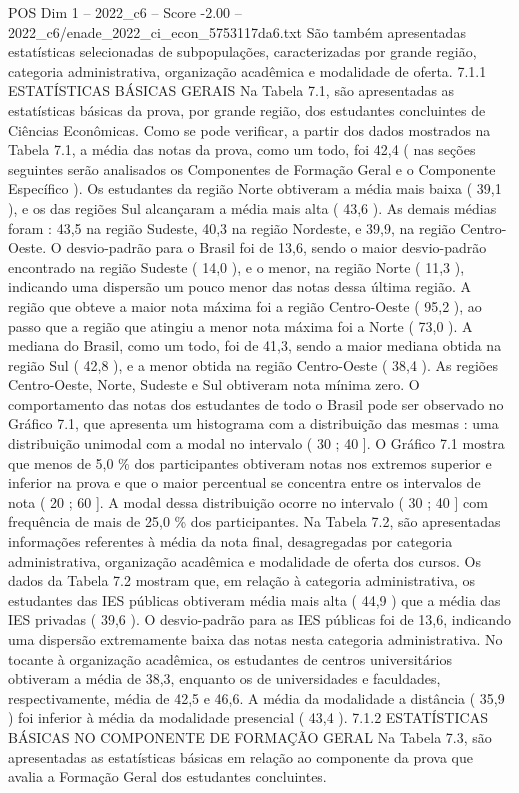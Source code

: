 \begin{textsample}{POS Dim 1 – 2022\_c6 – Score -2.00 – 2022\_c6/enade\_2022\_ci\_econ\_5753117da6.txt}
São também apresentadas estatísticas selecionadas de subpopulações, caracterizadas por grande região, categoria administrativa, organização acadêmica e modalidade de oferta. 7.1.1 ESTATÍSTICAS BÁSICAS GERAIS Na Tabela 7.1, são apresentadas as estatísticas básicas da prova, por grande região, dos estudantes concluintes de Ciências Econômicas.
Como se pode verificar, a partir dos dados mostrados na Tabela 7.1, a média das notas da prova, como um todo, foi 42,4 ( nas seções seguintes serão analisados os Componentes de Formação Geral e o Componente Específico ).
Os estudantes da região Norte obtiveram a média mais baixa ( 39,1 ), e os das regiões Sul alcançaram a média mais alta ( 43,6 ).
As demais médias foram : 43,5 na região Sudeste, 40,3 na região Nordeste, e 39,9, na região Centro-Oeste.
O desvio-padrão para o Brasil foi de 13,6, sendo o maior desvio-padrão encontrado na região Sudeste ( 14,0 ), e o menor, na região Norte ( 11,3 ), indicando uma dispersão um pouco menor das notas dessa última região.
A região que obteve a maior nota máxima foi a região Centro-Oeste ( 95,2 ), ao passo que a região que atingiu a menor nota máxima foi a Norte ( 73,0 ).
A mediana do Brasil, como um todo, foi de 41,3, sendo a maior mediana obtida na região Sul ( 42,8 ), e a menor obtida na região Centro-Oeste ( 38,4 ).
As regiões Centro-Oeste, Norte, Sudeste e Sul obtiveram nota mínima zero.
O comportamento das notas dos estudantes de todo o Brasil pode ser observado no Gráfico 7.1, que apresenta um histograma com a distribuição das mesmas : uma distribuição unimodal com a modal no intervalo ( 30 ; 40 ].
O Gráfico 7.1 mostra que menos de 5,0 \% dos participantes obtiveram notas nos extremos superior e inferior na prova e que o maior percentual se concentra entre os intervalos de nota ( 20 ; 60 ].
A modal dessa distribuição ocorre no intervalo ( 30 ; 40 ] com frequência de mais de 25,0 \% dos participantes.
Na Tabela 7.2, são apresentadas informações referentes à média da nota final, desagregadas por categoria administrativa, organização acadêmica e modalidade de oferta dos cursos.
Os dados da Tabela 7.2 mostram que, em relação à categoria administrativa, os estudantes das IES públicas obtiveram média mais alta ( 44,9 ) que a média das IES privadas ( 39,6 ).
O desvio-padrão para as IES públicas foi de 13,6, indicando uma dispersão extremamente baixa das notas nesta categoria administrativa.
No tocante à organização acadêmica, os estudantes de centros universitários obtiveram a média de 38,3, enquanto os de universidades e faculdades, respectivamente, média de 42,5 e 46,6.
A média da modalidade a distância ( 35,9 ) foi inferior à média da modalidade presencial ( 43,4 ). 7.1.2 ESTATÍSTICAS BÁSICAS NO COMPONENTE DE FORMAÇÃO GERAL Na Tabela 7.3, são apresentadas as estatísticas básicas em relação ao componente da prova que avalia a Formação Geral dos estudantes concluintes.

\end{textsample}
